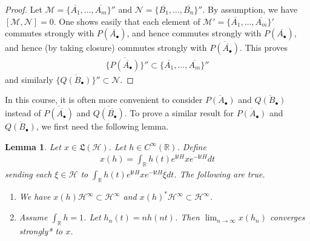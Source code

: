 \documentclass[12pt,b5paper,notitlepage]{article}
\theoremstyle{definition}
\theoremstyle{plain}
\newtheorem{lm}[df]{Lemma}
\newcommand{\fk}{\mathfrak}
\newcommand{\mc}{\mathcal}
\newcommand{\ovl}{\overline}
\newcommand{\im}{\mathbf{i}}
\newcommand{\blt}{\bullet}
\newcommand{\Rbb}{\mathbb R}
\newcommand{\dps}{\displaystyle}
\numberwithin{equation}{section}
\begin{document}

\begin{proof}
Let $\mc M=\{\ovl{A_1},\dots,\ovl{A_m}\}''$ and $\mc N=\{\ovl{B_1},\dots,\ovl{B_n}\}''$. By assumption, we have $[\mc M,\mc N]=0$. One shows easily that each element of $\mc M'=\{\ovl{A_1},\dots,\ovl{A_m}\}'$ commutes strongly with $P(\ovl{A_\blt})$, and hence commutes strongly with $P(\ovl{A_\blt})$, and hence (by taking closure) commutes strongly with $\ovl{P(\ovl{A_\blt})}$. This proves
\begin{align}
\{\ovl{P(\ovl{A_\blt})}\}''\subset\{\ovl{A_1},\dots,\ovl{A_m}\}''
\end{align}
and similarly $\{\ovl{Q(B_\blt)}\}''\subset\mc N$.
\end{proof}


In this course, it is often more convenient to consider $\ovl{P(A_\blt)}$ and $\ovl{Q(B_\blt)}$ instead of $\ovl{P(\ovl{A_\blt})}$ and $\ovl{Q(\ovl{B_\blt})}$. To prove a similar result for $\ovl{P(A_\blt)}$ and $\ovl{Q(B_\blt)}$, we first need the following lemma.



\begin{lm}\label{lb64}
Let $x\in\fk L(\mc H)$. Let $h\in C^\infty(\Rbb)$. Define
\begin{align}
x(h)=\int_\Rbb h(t)e^{\im tH}xe^{-\im tH}dt
\end{align}
sending each $\xi\in\mc H$ to $\int_\Rbb h(t)e^{\im tH}xe^{-\im tH}\xi dt$. The following are true.
\begin{enumerate}
\item We have $x(h)\mc H^\infty\subset\mc H^\infty$ and $x(h)^*\mc H^\infty\subset\mc H^\infty$.
\item Assume  $\int_\Rbb h=1$. Let $h_n(t)=nh(nt)$. Then $\dps\lim_{n\rightarrow\infty}x(h_n)$ converges strongly* to $x$.
\end{enumerate}
\end{lm}
\end{document}
